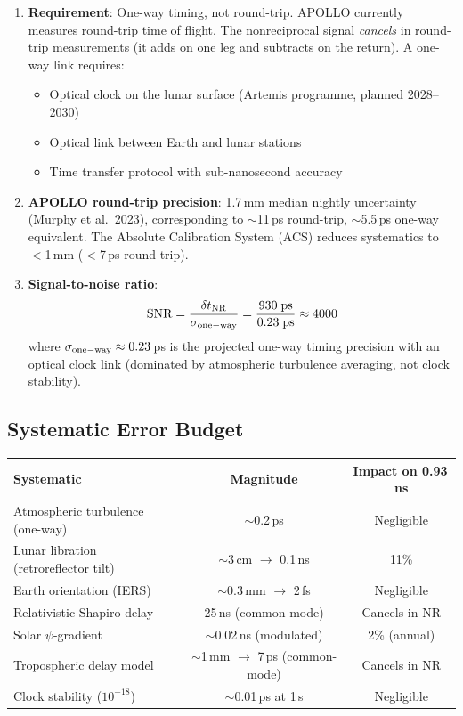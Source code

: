 \documentclass[11pt]{article}
\begin{document}
\begin{enumerate}
\item \textbf{Requirement}: One-way timing, not round-trip.
  APOLLO currently measures round-trip time of flight. The nonreciprocal
  signal \emph{cancels} in round-trip measurements (it adds on one leg
  and subtracts on the return). A one-way link requires:
  \begin{itemize}
  \item Optical clock on the lunar surface (Artemis programme, planned
    2028--2030)
  \item Optical link between Earth and lunar stations
  \item Time transfer protocol with sub-nanosecond accuracy
  \end{itemize}

\item \textbf{APOLLO round-trip precision}: 1.7\,mm median nightly
  uncertainty (Murphy et al.\ 2023), corresponding to $\sim$11\,ps
  round-trip, $\sim$5.5\,ps one-way equivalent. The Absolute Calibration
  System (ACS) reduces systematics to $<$1\,mm ($<$7\,ps round-trip).

\item \textbf{Signal-to-noise ratio}:
  \begin{equation}
  \text{SNR} = \frac{\delta t_{\rm NR}}{\sigma_{\rm one-way}}
  = \frac{930\;\text{ps}}{0.23\;\text{ps}} \approx 4000
  \end{equation}
  where $\sigma_{\rm one-way} \approx 0.23$\,ps is the projected one-way
  timing precision with an optical clock link (dominated by atmospheric
  turbulence averaging, not clock stability).
\end{enumerate}

\subsection{Systematic Error Budget}

\begin{table}[h]
\centering
\begin{tabular}{lcc}
\toprule
\textbf{Systematic} & \textbf{Magnitude} & \textbf{Impact on 0.93\,ns} \\
\midrule
Atmospheric turbulence (one-way) & $\sim$0.2\,ps & Negligible \\
Lunar libration (retroreflector tilt) & $\sim$3\,cm $\to$ 0.1\,ns & 11\% \\
Earth orientation (IERS) & $\sim$0.3\,mm $\to$ 2\,fs & Negligible \\
Relativistic Shapiro delay & 25\,ns (common-mode) & Cancels in NR \\
Solar $\psi$-gradient & $\sim$0.02\,ns (modulated) & 2\% (annual) \\
Tropospheric delay model & $\sim$1\,mm $\to$ 7\,ps (common-mode) & Cancels in NR \\
Clock stability ($10^{-18}$) & $\sim$0.01\,ps at 1\,s & Negligible \\
\bottomrule
\end{tabular}
\end{table}
\end{document}
